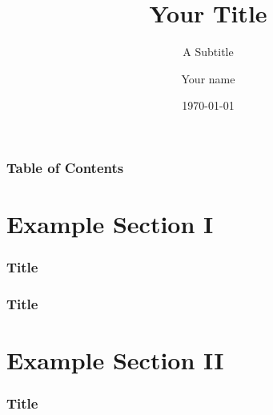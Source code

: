 \documentclass[aspectratio=169]{beamer}
\title{Your Title}
\subtitle{A Subtitle}
\author{Your name}
\institute{Montana State University\\ Your Department}
\date{\today}
\begin{document}
\begin{frame}
	\titlepage
\end{frame}

\begin{frame}
	\frametitle{Table of Contents}
	\tableofcontents
\end{frame}


\section{Example Section I}
\begin{frame}
	\frametitle{Title}

\end{frame}
\begin{frame}
	\frametitle{Title}

\end{frame}

\section{Example Section II}
\begin{frame}
	\frametitle{Title}

\end{frame}
\end{document}
